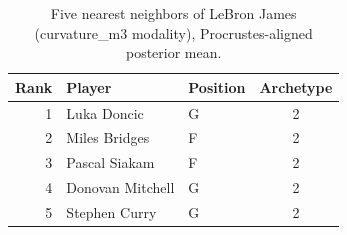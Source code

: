 \begin{table}[htbp]
  \centering\small
  \begin{tabular}{rllc}
    \toprule
    Rank & Player & Position & Archetype \\
    \midrule
    1 & Luka Doncic & G & 2 \\
    2 & Miles Bridges & F & 2 \\
    3 & Pascal Siakam & F & 2 \\
    4 & Donovan Mitchell & G & 2 \\
    5 & Stephen Curry & G & 2 \\
    \bottomrule
  \end{tabular}
  \caption{Five nearest neighbors of LeBron James (curvature_m3 modality), Procrustes-aligned posterior mean.}
  \label{tab:LeBron_James_neighbors_curvature_m3}
\end{table}

